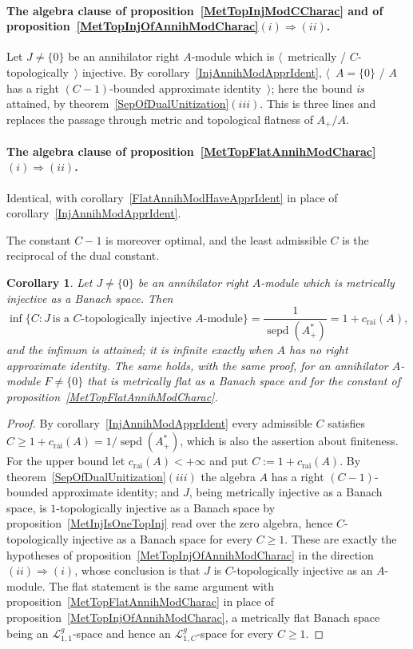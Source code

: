 \documentclass[11pt]{article}
\theoremstyle{plain}
\newtheorem{corollary}[theorem]{Corollary}
\theoremstyle{definition}
\DeclareMathOperator{\sepd}{sepd}
\newcommand{\crai}{c_{\mathrm{rai}}}
\begin{document}
\paragraph{The algebra clause of
proposition~\ref{MetTopInjModCCharac} and of
proposition~\ref{MetTopInjOfAnnihModCharac}$(i)\Rightarrow(ii)$.} Let
$J\neq \{0 \}$ be an annihilator right $A$-module which is
$\langle$~metrically / $C$-topologically~$\rangle$ injective. By
corollary~\ref{InjAnnihModApprIdent}, $\langle$~$A= \{0 \}$ / $A$ has a right
$(C-1)$-bounded approximate identity~$\rangle$; here the bound \emph{is}
attained, by theorem~\ref{SepOfDualUnitization}$(iii)$. This is three lines and
replaces the passage through metric and topological flatness of $A_+/A$.

\paragraph{The algebra clause of
proposition~\ref{MetTopFlatAnnihModCharac}$(i)\Rightarrow(ii)$.} Identical, with
corollary~\ref{FlatAnnihModHaveApprIdent} in place of
corollary~\ref{InjAnnihModApprIdent}.

The constant $C-1$ is moreover optimal, and the least admissible $C$ is the
reciprocal of the dual constant.

\begin{corollary}\label{InjAnnihModApprIdentOptimal}
Let $J\neq \{0 \}$ be an annihilator right $A$-module which is metrically
injective as a Banach space. Then
\[
\inf \{C:J\ \text{is a $C$-topologically injective $A$-module} \}
=\frac{1}{\sepd(A_+^*)}=1+\crai(A),
\]
and the infimum is attained; it is infinite exactly when $A$ has no right
approximate identity. The same holds, with the same proof, for an annihilator
$A$-module $F\neq \{0 \}$ that is metrically flat as a Banach space and for the
constant of proposition~\ref{MetTopFlatAnnihModCharac}.
\end{corollary}

\begin{proof}
By corollary~\ref{InjAnnihModApprIdent} every admissible $C$ satisfies
$C\geq 1+\crai(A)=1/\sepd(A_+^*)$, which is also the assertion about
finiteness. For the upper bound let $\crai(A)<+\infty$ and put
$C:=1+\crai(A)$. By theorem~\ref{SepOfDualUnitization}$(iii)$ the algebra $A$ has
a right $(C-1)$-bounded approximate identity; and $J$, being metrically injective
as a Banach space, is $1$-topologically injective as a Banach space by
proposition~\ref{MetInjIsOneTopInj} read over the zero algebra, hence
$C$-topologically injective as a Banach space for every $C\geq 1$. These are
exactly the hypotheses of
proposition~\ref{MetTopInjOfAnnihModCharac} in the direction
$(ii)\Rightarrow(i)$, whose conclusion is that $J$ is $C$-topologically injective
as an $A$-module. The flat statement is the same argument with
proposition~\ref{MetTopFlatAnnihModCharac} in place of
proposition~\ref{MetTopInjOfAnnihModCharac}, a metrically flat Banach space being
an $\mathscr{L}_{1,1}^g$-space and hence an $\mathscr{L}_{1,C}^g$-space for every
$C\geq 1$.
\end{proof}
\end{document}
